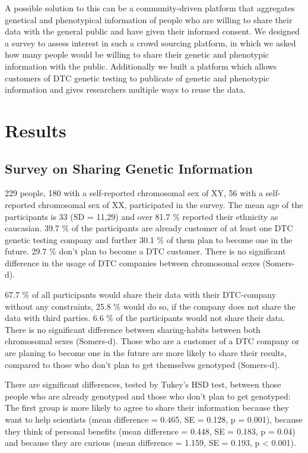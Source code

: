 \documentclass[10pt]{article}
\begin{document}
A possible solution to this can be a community-driven platform that aggregates genetical and phenotypical information of people who are willing to share their data with the general public and have given their informed consent. We designed a survey to assess interest in such a crowd sourcing platform, in which we asked how many people would be willing to share their genetic and phenotypic information with the public. Additionally we built a platform which allows customers of DTC genetic testing to publicate of genetic and phenotypic information and gives researchers multiple ways to reuse the data. 

\section*{Results}

\subsection*{Survey on Sharing Genetic Information}
229 people, 180 with a self-reported chromosomal sex of XY, 56 with a self-reported chromosomal sex of XX, participated in the survey. The mean age of the participants is 33 (SD = 11,29) and over 81.7 \% reported their ethnicity as caucasian. 39.7 \% of the participants are already customer of at least one DTC genetic testing company and further 30.1 \% of them plan to become one in the future. 29.7 \% don't plan to become a DTC customer. There is no significant difference in the usage of DTC companies between chromosomal sexes (Somers-d). 

67.7 \% of all participants would share their data with their DTC-company without any constraints, 25.8 \% would do so, if the company does not share the data with third parties. 6.6 \% of the participants would not share their data. There is no significant difference between sharing-habits between both chromosomal sexes (Somers-d). Those who are a customer of a DTC company or are planing to become one in the future are more likely to share their results, compared to those who don't plan to get themselves genotyped (Somers-d). 

There are significant differences, tested by Tukey's HSD test, between those people who are already genotyped and those who don't plan to get genotyped: The first group is more likely to agree to share their information because they want to help scientists (mean difference = 0.465, SE = 0.128, p = 0.001), because they think of personal benefits (mean difference = 0.448, SE = 0.183, p = 0.04) and because they are curious (mean difference = 1.159, SE = 0.193, p < 0.001). 
\end{document}
